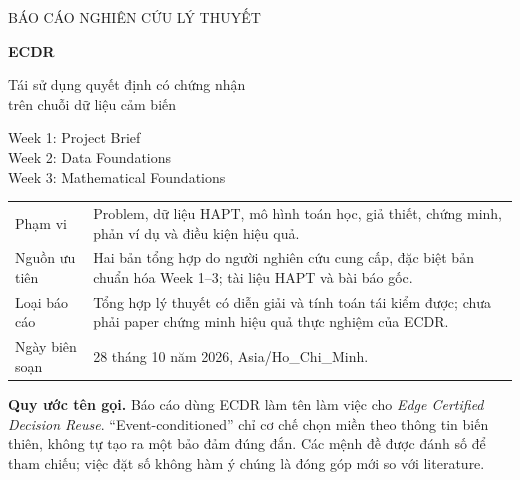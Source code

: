 \documentclass[11pt,a4paper]{article}
\theoremstyle{remark}
\begin{document}
\begin{titlepage}
\vspace*{1.2cm}
{\Large\color{teal} BÁO CÁO NGHIÊN CỨU LÝ THUYẾT\par}
\vspace{0.7cm}
{\huge\bfseries\color{ink} ECDR\par}
\vspace{0.4cm}
{\LARGE Tái sử dụng quyết định có chứng nhận\\trên chuỗi dữ liệu cảm biến\par}
\vspace{0.8cm}
{\Large Week 1: Project Brief\\[4pt]
Week 2: Data Foundations\\[4pt]
Week 3: Mathematical Foundations\par}
\vspace{1cm}
\begin{tabularx}{\linewidth}{@{}lY@{}}
\toprule
Phạm vi & Problem, dữ liệu HAPT, mô hình toán học, giả thiết, chứng minh,
phản ví dụ và điều kiện hiệu quả.\\
Nguồn ưu tiên & Hai bản tổng hợp do người nghiên cứu cung cấp, đặc biệt bản
chuẩn hóa Week 1--3; tài liệu HAPT và bài báo gốc.\\
Loại báo cáo & Tổng hợp lý thuyết có diễn giải và tính toán tái kiểm được;
chưa phải paper chứng minh hiệu quả thực nghiệm của ECDR.\\
Ngày biên soạn & 28 tháng 10 năm 2026, Asia/Ho\_Chi\_Minh.\\
\bottomrule
\end{tabularx}
\vfill
\textbf{Quy ước tên gọi.} Báo cáo dùng ECDR làm tên làm việc cho
\emph{Edge Certified Decision Reuse}. ``Event-conditioned'' chỉ cơ chế chọn
miền theo thông tin biến thiên, không tự tạo ra một bảo đảm đúng đắn.
Các mệnh đề được đánh số để tham chiếu; việc đặt số không hàm ý chúng là
đóng góp mới so với literature.
\end{titlepage}
\end{document}
